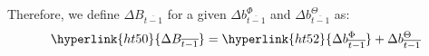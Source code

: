 \documentclass[class=article, crop=false]{standalone}
\begin{document}
Therefore, we define \hyperlink{ht50}{$\Delta B_{\overline{t-1}}$} for a given \hyperlink{ht52}{$\Delta b_{\overline{t-1}}^{\Phi}$} and $\Delta b_{\overline{t-1}}^{\Theta}$ as:
$$\hyperlink{ht50}{\Delta B_{\overline{t-1}}} = \hyperlink{ht52}{\Delta b_{\overline{t-1}}^{\Phi}} + \Delta b_{\overline{t-1}}^{\Theta}$$
    
\end{document}
